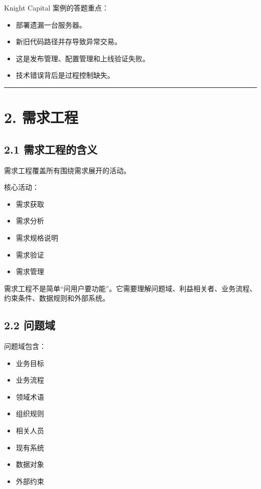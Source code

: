\documentclass[UTF8,zihao=-4]{ctexart}
\begin{document}
Knight Capital 案例的答题重点：

\begin{itemize}
\item 部署遗漏一台服务器。
\item 新旧代码路径并存导致异常交易。
\item 这是发布管理、配置管理和上线验证失败。
\item 技术错误背后是过程控制缺失。
\end{itemize}

\bigskip\hrule\bigskip

\section{2. 需求工程}

\subsection{2.1 需求工程的含义}

需求工程覆盖所有围绕需求展开的活动。

核心活动：

\begin{itemize}
\item 需求获取
\item 需求分析
\item 需求规格说明
\item 需求验证
\item 需求管理
\end{itemize}

需求工程不是简单“问用户要功能”。它需要理解问题域、利益相关者、业务流程、约束条件、数据规则和外部系统。

\subsection{2.2 问题域}

问题域包含：

\begin{itemize}
\item 业务目标
\item 业务流程
\item 领域术语
\item 组织规则
\item 相关人员
\item 现有系统
\item 数据对象
\item 外部约束
\end{itemize}
\end{document}

